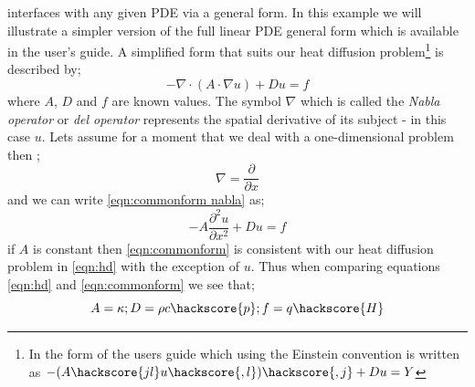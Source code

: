 \esc interfaces with any given PDE via a general form. In this example we will illustrate a simpler version of the full linear PDE general form which is available in the \esc user's guide. A simplified form that suits our heat diffusion problem\footnote{In the form of the \esc users guide which using the Einstein convention is written as 
$-(A\hackscore{jl} u\hackscore{,l})\hackscore{,j}+D u =Y$}
is described by;
\begin{equation}\label{eqn:commonform nabla}
-\nabla\cdot(A\cdot\nabla u) + Du = f
\end{equation}
where $A$, $D$ and $f$ are known values. The symbol $\nabla$ which is called the \textit{Nabla operator} or \textit{del operator} represents
the spatial derivative of its subject - in this case $u$. Lets assume for a moment that we deal with a one-dimensional problem then ;
\begin{equation}
\nabla = \frac{\partial}{\partial x}
\end{equation}
and we can write \ref{eqn:commonform nabla} as;
\begin{equation}\label{eqn:commonform}
-A\frac{\partial^{2}u}{\partial x^{2}} + Du = f
\end{equation}
if $A$ is constant then  \ref{eqn:commonform} is consistent with our heat diffusion problem in \ref{eqn:hd} with the exception of $u$. Thus when comparing equations \ref{eqn:hd} and \ref{eqn:commonform} we see that;
\begin{equation}
A = \kappa; D = \rho c \hackscore{p}; f = q \hackscore{H}
\end{equation}

